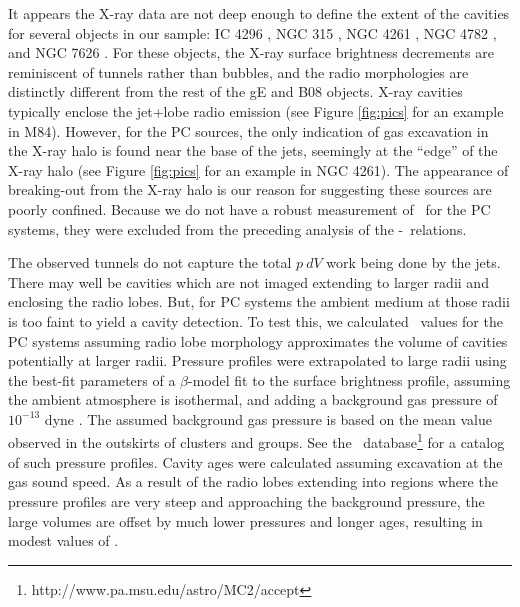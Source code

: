 \documentclass{emulateapj}
\begin{document}
It appears the X-ray data are not deep enough to define the extent of
the cavities for several objects in our sample: IC 4296
\citep{1988ApJ...324..198K, 2003ApJ...585..677P}, NGC 315
\citep{1979ApJ...228L...9B, 1981A&A....95..250W}, NGC 4261
\citep{1997ApJ...484..186J, 2000ApJ...534..165J}, NGC 4782
\citep{2007ApJ...664..804M}, and NGC 7626 \citep{1985ApJ...291...32B}.
For these objects, the X-ray surface brightness decrements are
reminiscent of tunnels rather than bubbles, and the radio morphologies
are distinctly different from the rest of the gE and B08
objects. X-ray cavities typically enclose the jet+lobe radio emission
(see Figure \ref{fig:pics} for an example in M84). However, for the PC
sources, the only indication of gas excavation in the X-ray halo is
found near the base of the jets, seemingly at the ``edge'' of the
X-ray halo (see Figure \ref{fig:pics} for an example in NGC 4261). The
appearance of breaking-out from the X-ray halo is our reason for
suggesting these sources are poorly confined.  Because we do not have
a robust measurement of \pcav\ for the PC systems, they were excluded
from the preceding analysis of the \pjet-\prad\ relations.

The observed tunnels do not capture the total $p~dV$ work being done
by the jets. There may well be cavities which are not imaged extending
to larger radii and enclosing the radio lobes. But, for PC systems the
ambient medium at those radii is too faint to yield a cavity
detection. To test this, we calculated \pcav\ values for the PC
systems assuming radio lobe morphology approximates the volume of
cavities potentially at larger radii. Pressure profiles were
extrapolated to large radii using the best-fit parameters of a
$\beta$-model \citep{betamodel} fit to the surface brightness profile,
assuming the ambient atmosphere is isothermal, and adding a background
gas pressure of $10^{-13}$ dyne \pcmsq. The assumed background gas
pressure is based on the mean value observed in the outskirts of
clusters and groups. See the
\accept\ database\footnote{http://www.pa.msu.edu/astro/MC2/accept} for
a catalog of such pressure profiles. Cavity ages were calculated
assuming excavation at the gas sound speed. As a result of the radio
lobes extending into regions where the pressure profiles are very
steep and approaching the background pressure, the large volumes are
offset by much lower pressures and longer ages, resulting in modest
values of \pcav.
\end{document}
